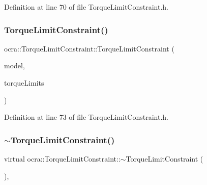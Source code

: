 Definition at line 70 of file Torque\+Limit\+Constraint.\+h.

\hypertarget{classocra_1_1TorqueLimitConstraint_adf43adabb40dc149d609b219fe8b7ac0}{}\label{classocra_1_1TorqueLimitConstraint_adf43adabb40dc149d609b219fe8b7ac0} 
\subsubsection{\texorpdfstring{Torque\+Limit\+Constraint()}{TorqueLimitConstraint()}\hspace{0.1cm}{\footnotesize\ttfamily [2/2]}}
{\footnotesize\ttfamily ocra\+::\+Torque\+Limit\+Constraint\+::\+Torque\+Limit\+Constraint (\begin{DoxyParamCaption}\item[{const Model \&}]{model,  }\item[{const Eigen\+::\+Vector\+Xd \&}]{torque\+Limits }\end{DoxyParamCaption})\hspace{0.3cm}{\ttfamily [inline]}}



Definition at line 73 of file Torque\+Limit\+Constraint.\+h.

\hypertarget{classocra_1_1TorqueLimitConstraint_a893e34cf1ab2a6faf59bf394e769bbe3}{}\label{classocra_1_1TorqueLimitConstraint_a893e34cf1ab2a6faf59bf394e769bbe3} 
\subsubsection{\texorpdfstring{$\sim$\+Torque\+Limit\+Constraint()}{~TorqueLimitConstraint()}}
{\footnotesize\ttfamily virtual ocra\+::\+Torque\+Limit\+Constraint\+::$\sim$\+Torque\+Limit\+Constraint (\begin{DoxyParamCaption}{ }\end{DoxyParamCaption})\hspace{0.3cm}{\ttfamily [inline]}, {\ttfamily [virtual]}}



